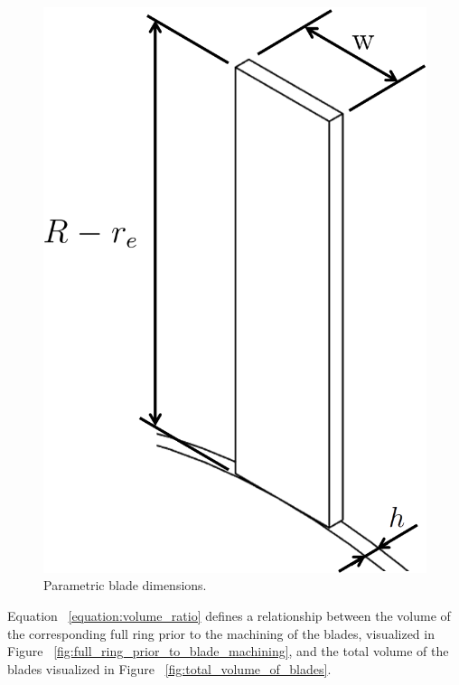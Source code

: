 \documentclass[12pt, a4paper, twoside]{article}
\begin{document}
\begin{figure}[h]
	\centering
	\includegraphics[scale=0.25]{parametric_blade}
	\caption{Parametric blade dimensions.}
	\label{fig:parametric_blade}
\end{figure}

Equation ~\ref{equation:volume_ratio} defines a relationship between the volume of the corresponding full ring prior to the machining of the blades, visualized in Figure ~\ref{fig:full_ring_prior_to_blade_machining}, and the total volume of the blades visualized in Figure ~\ref{fig:total_volume_of_blades}. 
\end{document}
